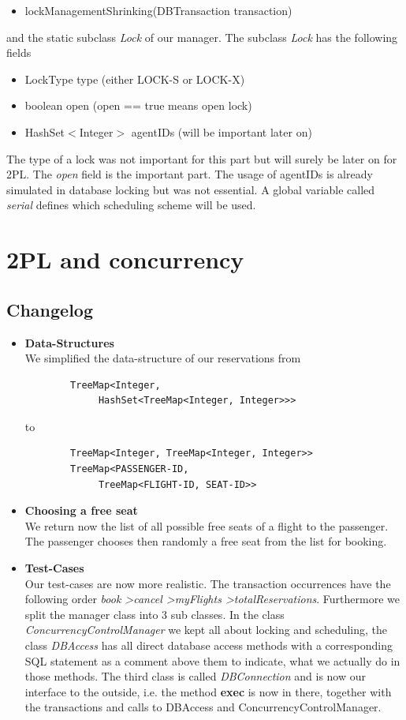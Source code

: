 \documentclass{vldb}
\begin{document}
\begin{itemize}
\begin{itemize}
	\item lockManagementShrinking(DBTransaction transaction)
\end{itemize}
and the static subclass \textit{Lock} of our manager. The subclass \textit{Lock} has the following fields
\begin{itemize}
	\item LockType type (either LOCK-S or LOCK-X)
	\item boolean open (open == true means open lock)
	\item HashSet$<$Integer$>$ agentIDs (will be important later on)
\end{itemize}
The type of a lock was not important for this part but will surely be later on for 2PL. The \textit{open} field is the important part. The usage of agentIDs is already simulated in database locking but was not essential. A global variable called \textit{serial} defines which scheduling scheme will be used.
\end{itemize}

\section{2PL and concurrency}
\subsection{Changelog}
\begin{itemize}
\item \textbf{Data-Structures}\\
We simplified the data-structure of our reservations from
	\begin{verbatim}
		TreeMap<Integer, 
		     HashSet<TreeMap<Integer, Integer>>>
	\end{verbatim}
to
	\begin{verbatim}
		TreeMap<Integer, TreeMap<Integer, Integer>>
		TreeMap<PASSENGER-ID, 
		     TreeMap<FLIGHT-ID, SEAT-ID>>
	\end{verbatim}
\item \textbf{Choosing a free seat}\\
We return now the list of all possible free seats of a flight to the passenger. The passenger chooses then randomly a free seat from the list for booking.
\item \textbf{Test-Cases}\\
Our test-cases are now more realistic. The transaction occurrences have the following order \textit{book \textgreater cancel \textgreater myFlights \textgreater totalReservations}. Furthermore we split the manager class into 3 sub classes. In the class \textit{ConcurrencyControlManager} we kept all about locking and scheduling, the class \textit{DBAccess} has all direct database access methods with a corresponding SQL statement as a comment above them to indicate, what we actually do in those methods. The third class is called \textit{DBConnection} and is now our interface to the outside, i.e. the method \textbf{exec} is now in there, together with the transactions and calls to DBAccess and ConcurrencyControlManager.
\end{itemize}
\end{document}
